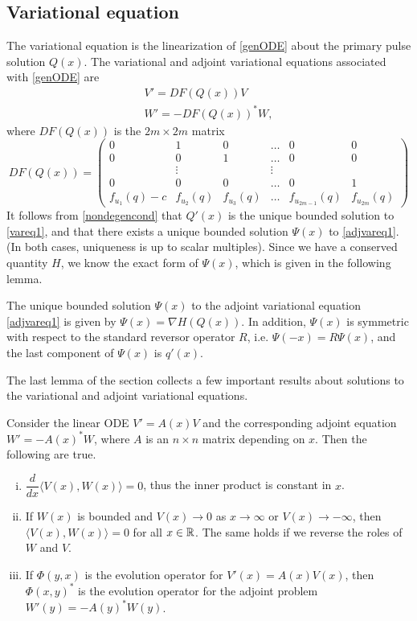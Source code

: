 \documentclass[thesis.tex]{subfiles}
\begin{document}
\subsection{Variational equation}\label{sec:vareq1}

The variational equation is the linearization of \cref{genODE} about the primary pulse solution $Q(x)$. The variational and adjoint variational equations associated with \cref{genODE} are
\begin{align}
V' = DF(Q(x)) V \label{vareq1} \\
W' = -DF(Q(x))^* W \label{adjvareq1},
\end{align}
where $DF(Q(x))$ is the $2m \times 2m$ matrix
\begin{equation}\label{defDF}
DF(Q(x)) = 
\begin{pmatrix}
0 & 1 & 0 & \dots & 0 & 0 \\
0 & 0 & 1 & \dots & 0 & 0 \\
& \vdots && \vdots \\
0 & 0 & 0 & \dots & 0 & 1 \\
f_{u_1}(q) - c & f_{u_2}(q) & f_{u_3}(q) & \dots & f_{u_{2m-1}}(q) & f_{u_{2m}}(q)
\end{pmatrix}
\end{equation}
It follows from \cref{nondegencond} that $Q'(x)$ is the unique bounded solution to \cref{vareq1}, and that there exists a unique bounded solution $\Psi(x)$ to \cref{adjvareq1}. (In both cases, uniqueness is up to scalar multiples). Since we have a conserved quantity $H$, we know the exact form of $\Psi(x)$, which is given in the following lemma.

\begin{lemma}\label{psiform}
The unique bounded solution $\Psi(x)$ to the adjoint variational equation \cref{adjvareq1} is given by $\Psi(x) = \nabla H(Q(x))$. In addition, $\Psi(x)$ is symmetric with respect to the standard reversor operator $R$, i.e. $\Psi(-x) = R \Psi(x)$, and
the last component of $\Psi(x)$ is $q'(x)$.
\end{lemma}

The last lemma of the section collects a few important results about solutions to the variational and adjoint variational equations.

\begin{lemma}\label{eigadjoint}
Consider the linear ODE $V' = A(x)V$ and the corresponding adjoint equation $W' = -A(x)^* W$, where $A$ is an $n \times n$ matrix depending on $x$. Then the following are true.
\begin{enumerate}[(i)]
\item $\dfrac{d}{dx}\langle V(x), W(x) \rangle = 0$, thus the inner product is constant in $x$.
\item If $W(x)$ is bounded and $V(x) \rightarrow 0$ as $x \rightarrow \infty$ or $V(x) \rightarrow -\infty$, then $\langle V(x), W(x) \rangle = 0$ for all $x \in \mathbb{R}$. The same holds if we reverse the roles of $W$ and $V$.
\item If $\Phi(y, x)$ is the evolution operator for $V'(x) = A(x)V(x)$, then $\Phi(x, y)^*$ is the evolution operator for the adjoint problem $W'(y) = -A(y)^* W(y)$.
\end{enumerate}
\end{lemma}
\end{document}
